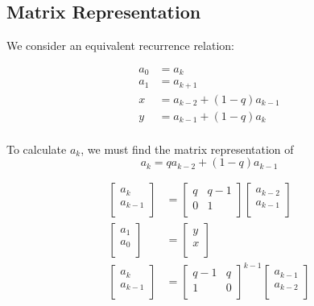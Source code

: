 \documentclass[paper.tex]{subfiles}
\begin{document}
\subsection{Matrix Representation}

We consider an equivalent recurrence relation:

\begin{align*}
	a_{0} &= a_{k} \\
	a_{1} &= a_{k+1} \\
	x &= a_{k-2} + (1-q)a_{k-1} \\
	y &= a_{k-1} + (1-q)a_{k} \\
\end{align*}

To calculate $a_{k}$, we must find the matrix representation of
$$ a_{k} = qa_{k-2} + (1-q)a_{k-1} $$

\begin{align*}
\left[ \begin{array}{ccc}
a_{k} \\
a_{k-1} \\
\end{array} \right]
&=
\left[ \begin{array}{ccc}
q & q-1 \\
0 & 1 \\
\end{array} \right]
\left[ \begin{array}{ccc}
 a_{k-2}\\
a_{k-1} \\
\end{array} \right] \\
\left[ \begin{array}{ccc}
a_{1} \\
a_{0} \\
\end{array} \right]
&=
\left[ \begin{array}{ccc}
y \\
x \\
\end{array} \right] \\
\left[ \begin{array}{ccc}
a_{k} \\
a_{k-1} \\
\end{array} \right]
&=
\left[ \begin{array}{ccc}
q-1 & q \\
1 & 0 \\
\end{array} \right] ^{k-1}
\left[ \begin{array}{ccc}
 a_{k-1}\\
a_{k-2} \\
\end{array} \right]
\end{align*}
\end{document}
